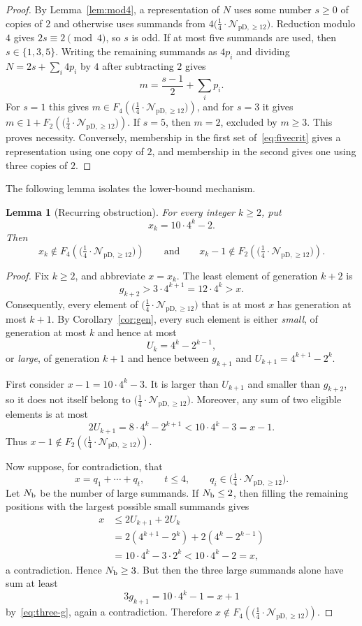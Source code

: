 \documentclass[12pt]{article}
\theoremstyle{plain}
\newtheorem{lemma}[theorem]{Lemma}
\theoremstyle{definition}
\theoremstyle{plain}
\newcommand{\Pset}{%
  \bigl(\tfrac{1}{4}\cdot\mathcal{N}_{\mathrm{pD},\geq 12}\bigr)%
}
\begin{document}
\begin{proof}
By Lemma~\ref{lem:mod4}, a representation of $N$ uses some number $s\geq0$ of
copies of $2$ and otherwise uses summands from $4\Pset$.  Reduction modulo $4$
gives $2s\equiv2\pmod4$, so $s$ is odd.  If at most five summands are used,
then $s\in\{1,3,5\}$.  Writing the remaining summands as $4p_i$ and dividing
$N=2s+\sum_i4p_i$ by $4$ after subtracting $2$ gives
\[
  m=\frac{s-1}{2}+\sum_i p_i.
\]
For $s=1$ this gives $m\in F_4(\Pset)$, and for $s=3$ it gives
$m\in1+F_2(\Pset)$.  If $s=5$, then $m=2$, excluded by $m\geq3$.  This proves
necessity.  Conversely, membership in the first set of~\eqref{eq:fivecrit}
gives a representation using one copy of $2$, and membership in the second
gives one using three copies of $2$.
\end{proof}

The following lemma isolates the lower-bound mechanism.

\begin{lemma}[Recurring obstruction]\label{lem:obstruction}
For every integer $k\geq2$, put
\[
  x_k=10\cdot4^k-2.
\]
Then
\begin{equation}\label{eq:obstruction}
  x_k\notin F_4(\Pset)
  \qquad\text{and}\qquad
  x_k-1\notin F_2(\Pset).
\end{equation}
\end{lemma}

\begin{proof}
Fix $k\geq2$, and abbreviate $x=x_k$.  The least element of generation $k+2$
is
\[
  g_{k+2}>3\cdot4^{k+1}=12\cdot4^k>x.
\]
Consequently, every element of $\Pset$ that is at most $x$ has generation at
most $k+1$.  By Corollary~\ref{cor:gen}, every such element is either
\emph{small}, of generation at most $k$ and hence at most
\[
  U_k=4^k-2^{k-1},
\]
or \emph{large}, of generation $k+1$ and hence between $g_{k+1}$ and
$U_{k+1}=4^{k+1}-2^k$.

First consider $x-1=10\cdot4^k-3$.  It is larger than $U_{k+1}$ and smaller
than $g_{k+2}$, so it does not itself belong to $\Pset$.  Moreover, any sum of
two eligible elements is at most
\[
  2U_{k+1}=8\cdot4^k-2^{k+1}<10\cdot4^k-3=x-1.
\]
Thus $x-1\notin F_2(\Pset)$.

Now suppose, for contradiction, that
\[
  x=q_1+\cdots+q_t,\qquad t\leq4,\qquad q_i\in\Pset.
\]
Let $N_{\rm b}$ be the number of large summands.  If $N_{\rm b}\leq2$, then filling
the remaining positions with the largest possible small summands gives
\begin{align*}
  x
  &\leq2U_{k+1}+2U_k\\
  &=2(4^{k+1}-2^k)+2(4^k-2^{k-1})\\
  &=10\cdot4^k-3\cdot2^k
  <10\cdot4^k-2=x,
\end{align*}
a contradiction.  Hence $N_{\rm b}\geq3$.  But then the three large summands
alone have sum at least
\[
  3g_{k+1}=10\cdot4^k-1=x+1
\]
by~\eqref{eq:three-g}, again a contradiction.  Therefore
$x\notin F_4(\Pset)$.
\end{proof}
\end{document}
